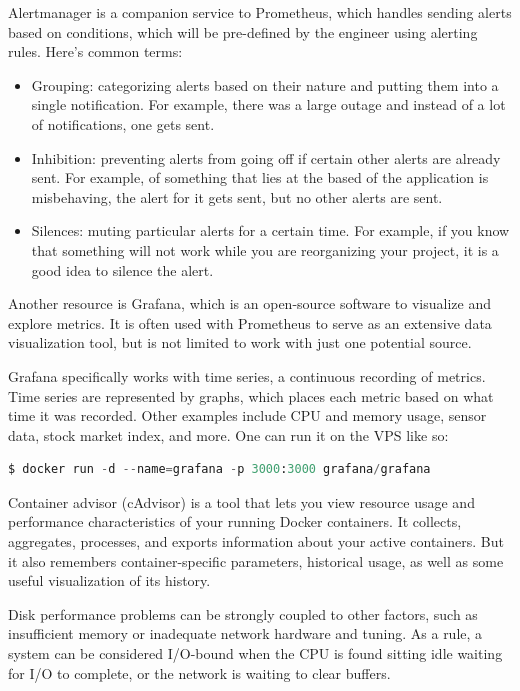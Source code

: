 \documentclass[11pt]{article}
\begin{document}
\noindent Alertmanager is a companion service to Prometheus, which handles sending alerts based on conditions, which will be pre-defined by the engineer using alerting rules. Here's common terms:
\begin{itemize}
    \item[] Grouping: categorizing alerts based on their nature and putting them into a single notification. For example, there was a large outage and instead of a lot of notifications, one gets sent.
    \item[] Inhibition: preventing alerts from going off if certain other alerts are already sent. For example, of something that lies at the based of the application is misbehaving, the alert for it gets sent, but no other alerts are sent.
    \item[] Silences: muting particular alerts for a certain time. For example, if you know that something will not work while you are reorganizing your project, it is a good idea to silence the alert.
\end{itemize}

\noindent Another resource is Grafana, which is an open-source software to visualize and explore metrics. It is often used with Prometheus to serve as an extensive data visualization tool, but is not limited to work with just one potential source. 

\noindent Grafana specifically works with time series, a continuous recording of metrics. Time series are represented by graphs, which places each metric based on what time it was recorded. Other examples include CPU and memory usage, sensor data, stock market index, and more. One can run it on the VPS like so:

\begin{lstlisting}[language=python]
$ docker run -d --name=grafana -p 3000:3000 grafana/grafana
\end{lstlisting}

\noindent Container advisor (cAdvisor) is a tool that lets you view resource usage and performance characteristics of your running Docker containers. It collects, aggregates, processes, and exports information about your active containers.  But it also remembers container-specific parameters, historical usage, as well as some useful visualization of its history.





\noindent Disk performance problems can be strongly coupled to other factors, such as insufficient memory or inadequate network hardware and tuning. As a rule, a system can be considered I/O-bound when the CPU is found sitting idle waiting for I/O to complete, or the network is waiting to clear buffers.
\end{document}
